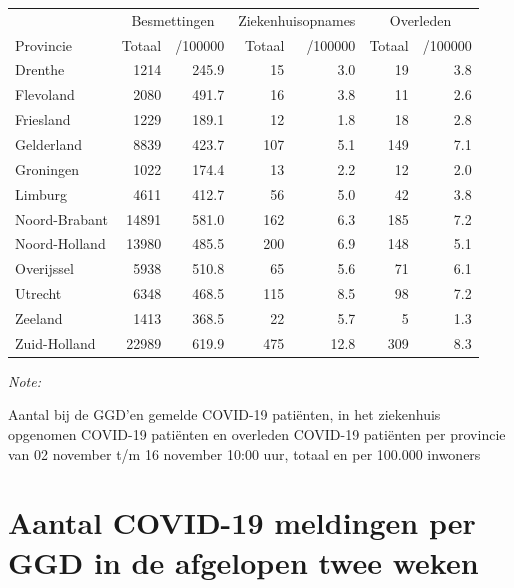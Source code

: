 \documentclass[
  english,
  man,floatsintext]{apa6}
\begin{document}
\begin{table}[H]
\centering
\begin{threeparttable}
\begin{tabular}{lrrrrrr}
\toprule
\multicolumn{1}{c}{ } & \multicolumn{2}{c}{Besmettingen} & \multicolumn{2}{c}{Ziekenhuisopnames} & \multicolumn{2}{c}{Overleden} \\
\cmidrule(l{3pt}r{3pt}){2-3} \cmidrule(l{3pt}r{3pt}){4-5} \cmidrule(l{3pt}r{3pt}){6-7}
Provincie & Totaal & /100000 & Totaal & /100000 & Totaal & /100000\\
\midrule
Drenthe & 1214 & 245.9 & 15 & 3.0 & 19 & 3.8\\
Flevoland & 2080 & 491.7 & 16 & 3.8 & 11 & 2.6\\
Friesland & 1229 & 189.1 & 12 & 1.8 & 18 & 2.8\\
Gelderland & 8839 & 423.7 & 107 & 5.1 & 149 & 7.1\\
Groningen & 1022 & 174.4 & 13 & 2.2 & 12 & 2.0\\
Limburg & 4611 & 412.7 & 56 & 5.0 & 42 & 3.8\\
Noord-Brabant & 14891 & 581.0 & 162 & 6.3 & 185 & 7.2\\
Noord-Holland & 13980 & 485.5 & 200 & 6.9 & 148 & 5.1\\
Overijssel & 5938 & 510.8 & 65 & 5.6 & 71 & 6.1\\
Utrecht & 6348 & 468.5 & 115 & 8.5 & 98 & 7.2\\
Zeeland & 1413 & 368.5 & 22 & 5.7 & 5 & 1.3\\
Zuid-Holland & 22989 & 619.9 & 475 & 12.8 & 309 & 8.3\\
\bottomrule
\end{tabular}
\begin{tablenotes}
\item \textit{Note: } 
\item Aantal bij de GGD’en gemelde COVID-19 patiënten, in het ziekenhuis opgenomen COVID-19 patiënten en overleden COVID-19 patiënten per provincie van 02 november t/m 16 november 10:00 uur, totaal en per 100.000 inwoners
\end{tablenotes}
\end{threeparttable}
\end{table}

\newpage

\hypertarget{aantal-covid-19-meldingen-per-ggd-in-de-afgelopen-twee-weken}{%
\section{Aantal COVID-19 meldingen per GGD in de afgelopen twee weken}\label{aantal-covid-19-meldingen-per-ggd-in-de-afgelopen-twee-weken}}
\end{document}
